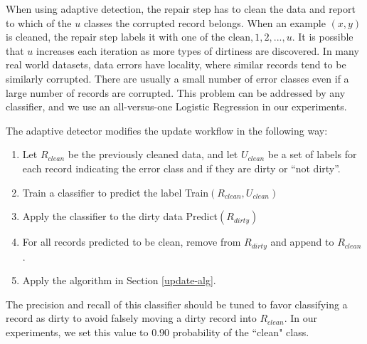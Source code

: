 When using adaptive detection, the repair step has to clean the data and report to which of the $u$ classes the corrupted record belongs.
When an example $(x,y)$ is cleaned, the repair step labels it with one of the ${\text{clean}, 1,2,...,u}$.
It is possible that $u$ increases each iteration as more types of dirtiness are discovered.
In many real world datasets, data errors have locality, where similar records tend to be similarly corrupted.
There are usually a small number of error classes even if a large number of records are corrupted.
This problem can be addressed by any classifier, and we use an all-versus-one Logistic Regression in our experiments.

The adaptive detector modifies the update workflow in the following way:
\begin{enumerate}
\item Let $R_{clean}$ be the previously cleaned data, and let $U_{clean}$ be a set of labels for each record indicating the error class and if they are dirty or ``not dirty''.
\item Train a classifier to predict the label \textsf{Train}$(R_{clean}, U_{clean})$
\item Apply the classifier to the dirty data \textsf{Predict}$(R_{dirty})$
\item For all records predicted to be clean, remove from $R_{dirty}$ and append to $R_{clean}$.
\item Apply the algorithm in Section \ref{update-alg}.
\end{enumerate}

The precision and recall of this classifier should be tuned to favor classifying a record as dirty to avoid falsely moving a dirty record into $R_{clean}$. In our experiments, we set this value to $0.90$ probability of the ``clean" class.






